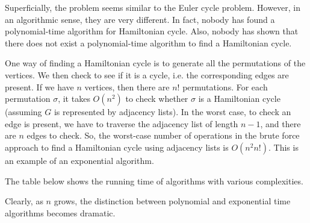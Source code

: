 \documentclass[a4paper, openany]{memoir}
\begin{document}
Superficially, the problem seems similar to the Euler cycle problem. However, in an algorithmic sense, they are very different. In fact, nobody has found a polynomial-time algorithm for Hamiltonian cycle. Also, nobody has shown that there does not exist a polynomial-time algorithm to find a Hamiltonian cycle.

One way of finding a Hamiltonian cycle is to generate all the permutations of the vertices. We then check to see if it is a cycle, i.e. the corresponding edges are present. If we have $n$ vertices, then there are $n!$ permutations. For each permutation $\sigma$, it takes $O(n^2)$ to check whether $\sigma$ is a Hamiltonian cycle (assuming $G$ is represented by adjacency lists). In the worst case, to check an edge is present, we have to traverse the adjacency list of length $n-1$, and there are $n$ edges to check. 
So, the worst-case number of operations in the brute force approach to find a Hamiltonian cycle using adjacency lists is $O(n^2 n!)$. This is an example of an exponential algorithm.

The table below shows the running time of algorithms with various complexities.
\begin{table}[H]
    \centering
    \caption{The running time of algorithms with various complexities (assuming $10^9$ operations per second).}
\end{table}
\noindent Clearly, as $n$ grows, the distinction between polynomial and exponential time algorithms becomes dramatic.
\end{document}
